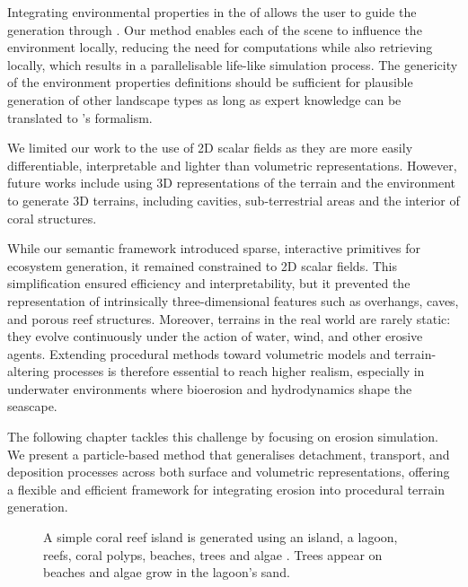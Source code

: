 Integrating environmental properties in the  of  allows the user to guide the generation through . Our method enables each  of the scene to influence the environment locally, reducing the need for computations while also retrieving  locally, which results in a parallelisable life-like simulation process. The genericity of the environment properties definitions should be sufficient for plausible generation of other landscape types as long as expert knowledge can be translated to 's formalism.

We limited our work to the use of 2D scalar fields as they are more easily differentiable, interpretable and lighter than volumetric representations. However, future works include using 3D representations of the terrain and the environment to generate 3D terrains, including cavities, sub-terrestrial areas and the interior of coral structures.

While our semantic  framework introduced sparse, interactive primitives for ecosystem generation, it remained constrained to 2D scalar fields. This simplification ensured efficiency and interpretability, but it prevented the representation of intrinsically three-dimensional features such as overhangs, caves, and porous reef structures. Moreover, terrains in the real world are rarely static: they evolve continuously under the action of water, wind, and other erosive agents. Extending procedural methods toward volumetric models and terrain-altering processes is therefore essential to reach higher realism, especially in underwater environments where bioerosion and hydrodynamics shape the seascape.

The following chapter tackles this challenge by focusing on erosion simulation. We present a particle-based method that generalises detachment, transport, and deposition processes across both surface and volumetric representations, offering a flexible and efficient framework for integrating erosion into procedural terrain generation.

\begin{figure}[H]
    \caption{A simple coral reef island is generated using an island, a lagoon, reefs, coral polyps, beaches, trees and algae . Trees appear on beaches and algae grow in the lagoon's sand.}
    \label{fig:env-obj-coral-island-scene}
\end{figure}
